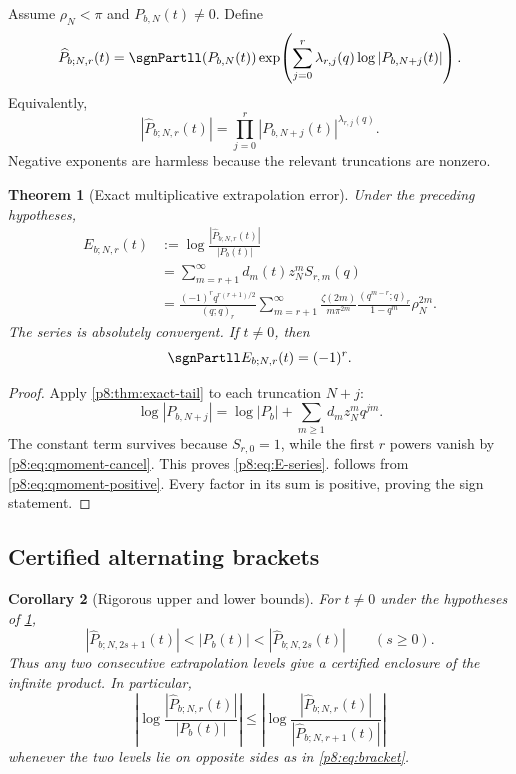 \documentclass[11pt]{article}
\numberwithin{equation}{section}
\newtheorem{theorem}{Theorem}[section]
\newtheorem{corollary}[theorem]{Corollary}
\theoremstyle{definition}
\theoremstyle{remark}
\begin{document}
Assume $\rho_N<\pi$ and $P_{b,N}(t)\ne0$. Define
\begin{equation}
\widehat P_{b;N,r}(t)
=\sgnPartll(P_{b,N}(t))
\exp\!\left(\sum_{j=0}^{r}\lambda_{r,j}(q)
\log|P_{b,N+j}(t)|\right).
\label{p8:eq:Phat}
\end{equation}
Equivalently,
\begin{equation}
|\widehat P_{b;N,r}(t)|
=\prod_{j=0}^{r}|P_{b,N+j}(t)|^{\lambda_{r,j}(q)}.
\label{p8:eq:Phat-product}
\end{equation}
Negative exponents are harmless because the relevant truncations are nonzero.

\begin{theorem}[Exact multiplicative extrapolation error]
\label{p8:thm:exact-rich-error}
Under the preceding hypotheses,
\begin{align}
E_{b;N,r}(t)
&:=\log\frac{|\widehat P_{b;N,r}(t)|}{|P_b(t)|}
\label{p8:eq:E-def}\\
&=\sum_{m=r+1}^{\infty}d_m(t)z_N^mS_{r,m}(q)
\label{p8:eq:E-series}\\
&=\frac{(-1)^rq^{r(r+1)/2}}{(q;q)_r}
\sum_{m=r+1}^{\infty}
\frac{\zeta(2m)}{m\pi^{2m}}
\frac{(q^{m-r};q)_r}{1-q^m}\rho_N^{2m}.
\label{p8:eq:E-explicit}
\end{align}
The series is absolutely convergent. If $t\ne0$, then
\begin{equation}
\sgnPartll E_{b;N,r}(t)=(-1)^r.
\label{p8:eq:E-sign}
\end{equation}
\end{theorem}

\begin{proof}
Apply \cref{p8:thm:exact-tail} to each truncation $N+j$:
\[
\log|P_{b,N+j}|=\log|P_b|+
\sum_{m\ge1}d_m z_N^m q^{jm}.
\]
The constant term survives because $S_{r,0}=1$, while the first $r$ powers vanish by \cref{p8:eq:qmoment-cancel}. This proves \cref{p8:eq:E-series}.  follows from \cref{p8:eq:qmoment-positive}. Every factor in its sum is positive, proving the sign statement.
\end{proof}

\subsection{Certified alternating brackets}

\begin{corollary}[Rigorous upper and lower bounds]
\label{p8:cor:brackets}
For $t\ne0$ under the hypotheses of \cref{p8:thm:exact-rich-error},
\begin{equation}
|\widehat P_{b;N,2s+1}(t)|<|P_b(t)|<
|\widehat P_{b;N,2s}(t)|
\qquad(s\ge0).
\label{p8:eq:bracket}
\end{equation}
Thus any two consecutive extrapolation levels give a certified enclosure of the infinite product. In particular,
\begin{equation}
\left|\log\frac{|\widehat P_{b;N,r}(t)|}{|P_b(t)|}\right|
\le
\left|\log\frac{|\widehat P_{b;N,r}(t)|}
{|\widehat P_{b;N,r+1}(t)|}\right|
\label{p8:eq:aposteriori-log}
\end{equation}
whenever the two levels lie on opposite sides as in \cref{p8:eq:bracket}.
\end{corollary}
\end{document}
